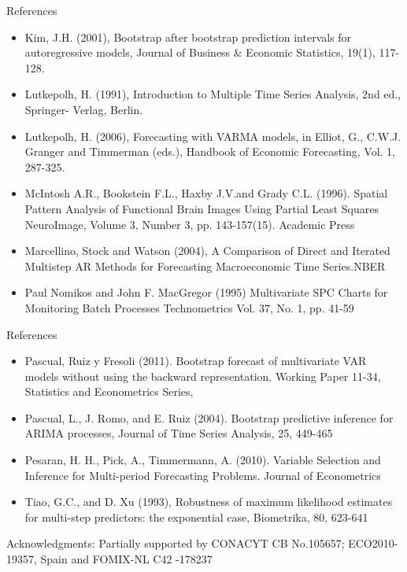 \documentclass{beamer}
\newcommand{\?}{?`}
\begin{document}
\begin{frame}{References}
\begin{footnotesize}
    \begin{itemize}

\item Kim, J.H. (2001), Bootstrap after bootstrap prediction intervals for autoregressive models,
Journal of Business \& Economic Statistics, 19(1), 117-128.
\item Lutkepolh, H. (1991), Introduction to Multiple Time Series Analysis, 2nd ed., Springer-
Verlag, Berlin.
\item Lutkepolh, H. (2006), Forecasting with VARMA models, in Elliot, G., C.W.J. Granger and
Timmerman (eds.), Handbook of Economic Forecasting, Vol. 1, 287-325.
\item McIntosh A.R., Bookstein F.L., Haxby J.V.and Grady C.L. (1996). Spatial Pattern Analysis of Functional
Brain Images Using Partial Least Squares NeuroImage, Volume 3, Number 3, pp. 143-157(15). Academic Press
\item Marcellino, Stock and Watson (2004), A Comparison of Direct and Iterated Multistep AR Methods for Forecasting Macroeconomic Time Series.NBER
\item Paul Nomikos and John F. MacGregor (1995) Multivariate SPC Charts for Monitoring Batch Processes Technometrics Vol. 37, No. 1, pp. 41-59

  \end{itemize}
 \end{footnotesize}
\end{frame}


\begin{frame}{References}
\begin{footnotesize}
    \begin{itemize}

\item Pascual, Ruiz y Fresoli (2011). Bootstrap forecast of multivariate VAR models without using the backward representation. Working Paper 11-34, Statistics and Econometrics Series,
\item Pascual, L., J. Romo, and E. Ruiz (2004). Bootstrap predictive inference for ARIMA processes, Journal of Time Series Analysis, 25, 449-465
\item Pesaran, H. H., Pick, A., Timmermann, A. (2010). Variable Selection and Inference for Multi-period Forecasting Problems. Journal of Econometrics
\item Tiao, G.C., and D. Xu (1993), Robustness of maximum likelihood estimates for
multi-step predictors: the exponential case, Biometrika, 80, 623-641

   \end{itemize}
 \end{footnotesize}

 {\tiny Acknowledgments: Partially supported by CONACYT CB No.105657; ECO2010-19357, Spain
  and FOMIX-NL C42 -178237}
\end{frame}
\end{document}
